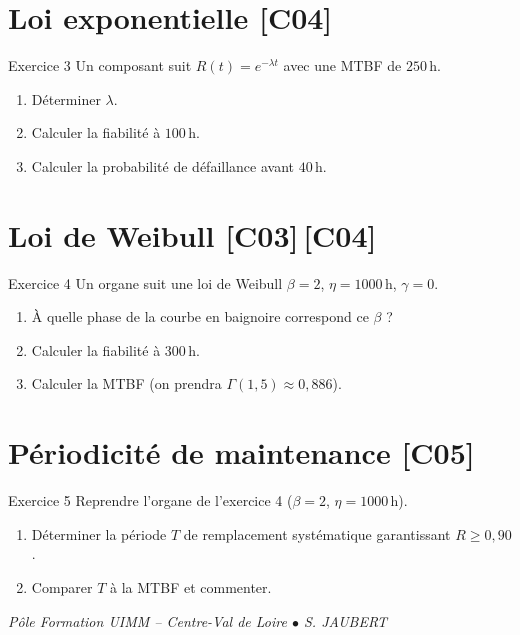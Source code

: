 \documentclass[a4paper,11pt]{article}
\begin{document}
\section{Loi exponentielle \hfill {\normalsize\color{uimmred}[C04]}}
\begin{exo}{Exercice 3}
Un composant suit $R(t) = e^{-\lambda t}$ avec une MTBF de $250$\,h.
\begin{enumerate}[label=\alph*)]
  \item Déterminer $\lambda$.
  \item Calculer la fiabilité à $100$\,h.
  \item Calculer la probabilité de défaillance avant $40$\,h.
\end{enumerate}
\end{exo}

\section{Loi de Weibull \hfill {\normalsize\color{uimmred}[C03]\,[C04]}}
\begin{exo}{Exercice 4}
Un organe suit une loi de Weibull $\beta = 2$, $\eta = 1000$\,h, $\gamma = 0$.
\begin{enumerate}[label=\alph*)]
  \item À quelle phase de la courbe en baignoire correspond ce $\beta$ ?
  \item Calculer la fiabilité à $300$\,h.
  \item Calculer la MTBF (on prendra $\Gamma(1{,}5) \approx 0{,}886$).
\end{enumerate}
\end{exo}

\section{Périodicité de maintenance \hfill {\normalsize\color{uimmred}[C05]}}
\begin{exo}{Exercice 5}
Reprendre l'organe de l'exercice 4 ($\beta = 2$, $\eta = 1000$\,h).
\begin{enumerate}[label=\alph*)]
  \item Déterminer la période $T$ de remplacement systématique garantissant $R \geq 0{,}90$.
  \item Comparer $T$ à la MTBF et commenter.
\end{enumerate}
\end{exo}

\vfill
\begin{center}\color{uimmgray}\small
\textit{Pôle Formation UIMM -- Centre-Val de Loire $\bullet$ S. JAUBERT}
\end{center}
\end{document}
